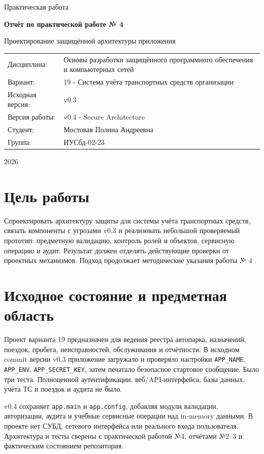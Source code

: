 \documentclass[12pt,a4paper]{article}
\begin{document}
\begin{titlepage}
\centering
{\large Практическая работа\par}
\vspace{2.5cm}
{\LARGE\bfseries Отчёт по практической работе № 4\par}
\vspace{0.6cm}
{\Large Проектирование защищённой архитектуры приложения\par}
\vspace{1.8cm}
\begin{tabular}{p{4cm}p{11cm}}
Дисциплина: & Основы разработки защищённого программного обеспечения и компьютерных сетей\\
Вариант: & 19 - Система учёта транспортных средств организации\\
Исходная версия: & v0.3\\
Версия работы: & v0.4 - Secure Architecture\\
Студент: & Мостовая Полина Андреевна\\
Группа: & ИУСбд-02-23
\end{tabular}
\vfill
{\large 2026\par}
\end{titlepage}
\tableofcontents
\clearpage

\section{Цель работы}
Спроектировать архитектуру защиты для системы учёта транспортных средств, связать компоненты с угрозами v0.3 и реализовать небольшой проверяемый прототип: предметную валидацию, контроль ролей и объектов, сервисную операцию и аудит. Результат должен отделять действующие проверки от проектных механизмов. Подход продолжает методические указания работы № 4 \cite{method4}.

\section{Исходное состояние и предметная область}
Проект варианта 19 предназначен для ведения реестра автопарка, назначений, поездок, пробега, неисправностей, обслуживания и отчётности. В исходном commit версии v0.3 приложение загружало и проверяло настройки \texttt{APP\_NAME}, \texttt{APP\_ENV}, \texttt{APP\_SECRET\_KEY}, затем печатало безопасное стартовое сообщение. Было три теста. Полноценной аутентификации, веб/API-интерфейса, базы данных, учёта ТС и поездок и аудита не было.

v0.4 сохраняет \texttt{app.main} и \texttt{app.config}, добавляя модули валидации, авторизации, аудита и учебные сервисные операции над in-memory данными. В проекте нет СУБД, сетевого интерфейса или реального входа пользователя. Архитектура и тесты сверены с практической работой №4, отчётами №2–3 и фактическим состоянием репозитория.
\end{document}
